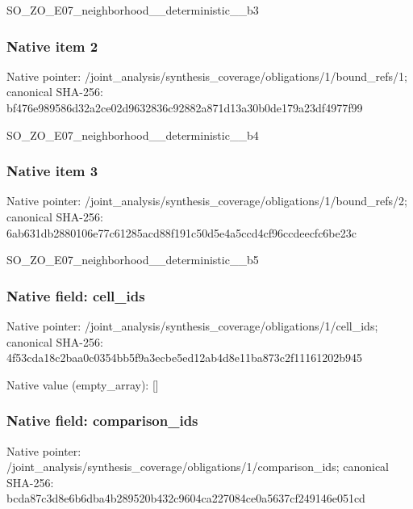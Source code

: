 \documentclass[10pt,a4paper]{article}
\begin{document}
\begingroup\raggedright\sloppy SO\_\allowbreak{}ZO\_\allowbreak{}E07\_\allowbreak{}neighborhood\_\allowbreak{}\_\allowbreak{}deterministic\_\allowbreak{}\_\allowbreak{}b3\par\endgroup

\subsubsection{Native item 2}
Native pointer: /joint\_\allowbreak{}analysis/synthesis\_\allowbreak{}coverage/obligations/1/bound\_\allowbreak{}refs/1; canonical SHA-256: bf476e989586d32a2ce02d9632836c92882a871d13a30b0de179a23df4977f99

\begingroup\raggedright\sloppy SO\_\allowbreak{}ZO\_\allowbreak{}E07\_\allowbreak{}neighborhood\_\allowbreak{}\_\allowbreak{}deterministic\_\allowbreak{}\_\allowbreak{}b4\par\endgroup

\subsubsection{Native item 3}
Native pointer: /joint\_\allowbreak{}analysis/synthesis\_\allowbreak{}coverage/obligations/1/bound\_\allowbreak{}refs/2; canonical SHA-256: 6ab631db2880106e77c61285acd88f191c50d5e4a5ccd4cf96ccdeecfc6be23c

\begingroup\raggedright\sloppy SO\_\allowbreak{}ZO\_\allowbreak{}E07\_\allowbreak{}neighborhood\_\allowbreak{}\_\allowbreak{}deterministic\_\allowbreak{}\_\allowbreak{}b5\par\endgroup

\subsubsection{Native field: cell\_\allowbreak{}ids}
Native pointer: /joint\_\allowbreak{}analysis/synthesis\_\allowbreak{}coverage/obligations/1/cell\_\allowbreak{}ids; canonical SHA-256: 4f53cda18c2baa0c0354bb5f9a3ecbe5ed12ab4d8e11ba873c2f11161202b945

Native value (empty\_\allowbreak{}array): []

\subsubsection{Native field: comparison\_\allowbreak{}ids}
Native pointer: /joint\_\allowbreak{}analysis/synthesis\_\allowbreak{}coverage/obligations/1/comparison\_\allowbreak{}ids; canonical SHA-256: bcda87c3d8e6b6dba4b289520b432c9604ca227084ce0a5637cf249146e051cd
\end{document}
